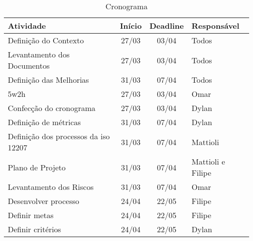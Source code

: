 \begin{table}[h!]
\centering
\caption{Cronograma}
\label{cronograma}
\begin{tabular}{|l|c|c|l|}
\hline
\textbf{Atividade}                   & \multicolumn{1}{l|}{\textbf{Início}} & \multicolumn{1}{l|}{\textbf{Deadline}} & \textbf{Responsável} \\ \hline
Definição do Contexto                & 27/03                                & 03/04                                  & Todos                \\ \hline
Levantamento dos Documentos          & 27/03                                & 03/04                                  & Todos                \\ \hline
Definição das Melhorias              & 31/03                                & 07/04                                  & Todos                \\ \hline
5w2h                                 & 27/03                                & 03/04                                  & Omar                 \\ \hline
Confecção do cronograma              & 27/03                                & 03/04                                  & Dylan                \\ \hline
Definição de métricas                & 31/03                                & 07/04                                  & Dylan                \\ \hline
Definição dos processos da iso 12207 & 31/03                                & 07/04                                  & Mattioli             \\ \hline
Plano de Projeto                     & 31/03                                & 07/04                                  & Mattioli e Filipe    \\ \hline
Levantamento dos Riscos              & 31/03                                & 07/04                                  & Omar                 \\ \hline
Desenvolver processo                 & 24/04                                & 22/05                                  & Filipe               \\ \hline
Definir metas                        & 24/04                                & 22/05                                  & Filipe               \\ \hline
Definir critérios                    & 24/04                                & 22/05                                  & Dylan                \\ \hline
\end{tabular}
\end{table}